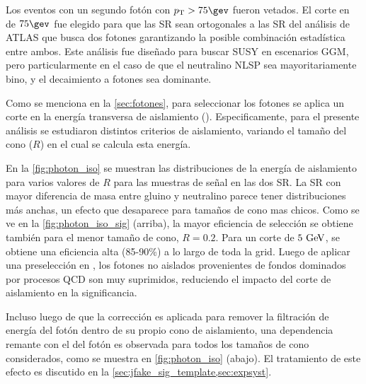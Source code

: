Los eventos con un segundo fotón con $\pt > 75 \gev$ fueron vetados. El corte en
{\pt} de $75\gev$ fue elegido para que las SR sean ortogonales a las SR del
análisis de ATLAS que busca dos fotones\cite{ATLAS-CONF-2014-001} garantizando la
posible combinación estadística entre ambos. Este análisis fue diseñado para
buscar SUSY en escenarios GGM, pero particularmente en el caso de que el
neutralino NLSP sea mayoritariamente bino, y el decaimiento a fotones sea
dominante.



Como se menciona en la \cref{sec:fotones}, para seleccionar los fotones se
aplica un corte en la energía transversa de aislamiento (\etiso). Especificamente,
para el presente análisis se estudiaron distintos
criterios de aislamiento, variando el tamaño del cono ($R$) en el cual se
calcula esta energía.


En la \cref{fig:photon_iso} se muestran las distribuciones de la energía de
aislamiento para varios valores de $R$ para las muestras de señal en las dos SR.
La SR con mayor diferencia de masa entre gluino y neutralino parece tener
distribuciones más anchas, un efecto que desaparece para tamaños de cono mas
chicos. Como se ve en la \cref{fig:photon_iso_sig} (arriba), la mayor eficiencia
de selección se obtiene también para el menor tamaño de cono, $R = 0.2$. Para un
corte de $5 \GeV$, se obtiene una eficiencia alta (85-90\%) a lo largo de toda la
grid. Luego de aplicar una preselección en {\met}, los fotones no aislados
provenientes de fondos dominados por procesos QCD son muy suprimidos, reduciendo el impacto
del corte de aislamiento en la significancia.

Incluso luego de que la corrección es aplicada para remover la filtración de
energía del fotón dentro de su propio cono de aislamiento, una dependencia remante
con el {\pt} del fotón es observada para todos los tamaños de cono
considerados, como se muestra en \cref{fig:photon_iso} (abajo). El tratamiento
de este efecto es discutido en la \cref{sec:jfake_sig_template,sec:expsyst}.


